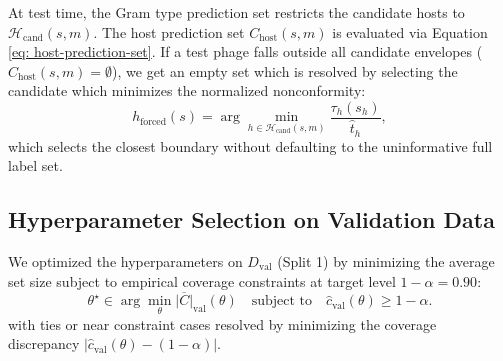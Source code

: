 
At test time, the Gram type prediction set restricts the candidate hosts to $\mathcal{H}_{\text{cand}}(s,m)$. The host 
prediction set $C_{\text{host}}(s,m)$ is evaluated via Equation \ref{eq: host-prediction-set}. If a test phage falls outside 
all candidate envelopes ($C_{\text{host}}(s,m) = \emptyset$), we get an empty set which is resolved by selecting the 
candidate which minimizes the normalized nonconformity:
\begin{equation}
h_{\text{forced}}(s) = \arg\min_{h \in \mathcal{H}_{\text{cand}}(s,m)} \frac{\tau_h(s_h)}{\hat{t}_h},
\label{eq: forced fallback}
\end{equation}
which selects the closest boundary without defaulting to the uninformative full label set.


\subsection{Hyperparameter Selection on Validation Data}
\label{sec5.3.2: host tuning}

We optimized the hyperparameters on $D_{\text{val}}$ (Split 1) by minimizing the average set size subject to empirical 
coverage constraints at target level $1 - \alpha = 0.90$:
\begin{equation}
\label{eq: constrained-opt}
\theta^\star \in \arg\min_{\theta} \overline{|C|}_{\text{val}}(\theta) \quad \text{subject to} \quad \hat{c}_{\text{val}}(\theta) 
\ge 1 - \alpha.
\end{equation}
with ties or near constraint cases resolved by minimizing the coverage discrepancy $|\hat{c}_{\text{val}}(\theta) - 
(1 - \alpha)|$.

